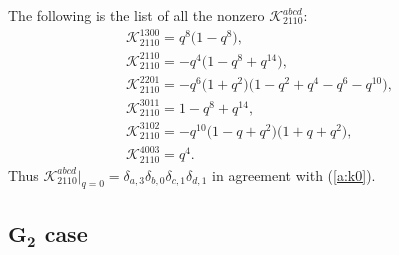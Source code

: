 \documentclass[pdftex]{sigma}
\begin{document}
\begin{example}\label{ex:K}
The following is the list of all the nonzero $\mathscr{K}^{abcd}_{2110}$:
\begin{gather*}
\mathscr{K}^{1300}_{2110}=q^8 \big(1 - q^8\big),\\
\mathscr{K}^{2110}_{2110} =-q^4 \big(1 - q^8 + q^{14}\big),\\
\mathscr{K}^{2201}_{2110} =-q^6 \big(1 + q^2\big) \big(1 - q^2 + q^4 - q^6 - q^{10}\big),\\
\mathscr{K}^{3011}_{2110} =1 - q^8 + q^{14},\\
\mathscr{K}^{3102}_{2110} =-q^{10} \big(1 - q + q^2\big) \big(1 + q + q^2\big),\\
\mathscr{K}^{4003}_{2110}=q^4.
\end{gather*}
Thus $\mathscr{K}^{abcd}_{2110}|_{q=0}
= \delta_{a,3}\delta_{b,0}\delta_{c,1}\delta_{d,1}$ in agreement with
(\ref{a:k0}).
\end{example}

\subsection[$G_2$ case]{$\boldsymbol{G_2}$ case}\label{a:ss:g2}
\end{document}
